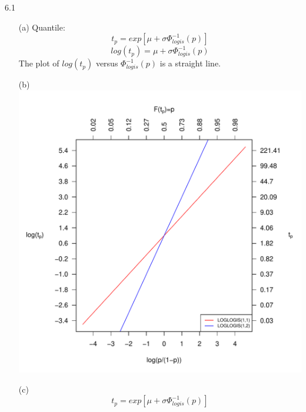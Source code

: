 \documentclass[paper=a4, fontsize=12pt]{scrartcl} %
\numberwithin{equation}{section} %
\numberwithin{figure}{section} %
\numberwithin{table}{section} %
\begin{document}
6.1
\begin{itemize}
	\item[(a)]	Quantile: 	$$t_p = exp\left[ \mu + \sigma \Phi_{logis}^{-1}(p) \right]$$
					$$log(t_p) =  \mu + \sigma \Phi_{logis}^{-1}(p)$$
			The plot of $log(t_p)$ versus $\Phi_{logis}^{-1}(p)$ is a straight line.
	
	\newpage
	
	\item[(b)]	\ \\
			\includegraphics[width = \textwidth]{f_6_1_b.pdf}
			
	\item[(c)]	$$t_p = exp\left[ \mu + \sigma \Phi_{logis}^{-1}(p) \right]$$
\end{itemize}
\end{document}
